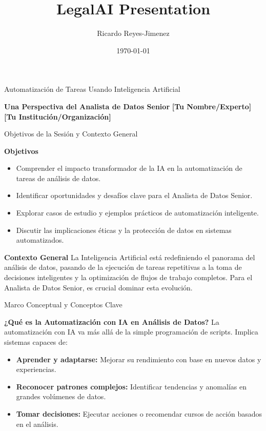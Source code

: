 \documentclass[aspectratio=169]{beamer}
\title[LegalAI Presentation]{LegalAI Presentation}
\subtitle{}
\author{Ricardo Reyes-Jimenez}
\institute{Universidad de La Sabana}
\date{\today}
\begin{document}
\begin{frame}
  \titlepage
\end{frame}

\usebackgroundtemplate{}


\begin{frame}{Automatización de Tareas Usando Inteligencia Artificial}

\textbf{Una Perspectiva del Analista de Datos Senior}
\textbf{[Tu Nombre/Experto]}
\textbf{[Tu Institución/Organización]}

\end{frame}

\begin{frame}{Objetivos de la Sesión y Contexto General}


\textbf{Objetivos}
\begin{itemize}
  \item Comprender el impacto transformador de la IA en la automatización de tareas de análisis de datos.
  \item Identificar oportunidades y desafíos clave para el Analista de Datos Senior.
  \item Explorar casos de estudio y ejemplos prácticos de automatización inteligente.
  \item Discutir las implicaciones éticas y la protección de datos en sistemas automatizados.
\end{itemize}
\textbf{Contexto General}
La Inteligencia Artificial está redefiniendo el panorama del análisis de datos, pasando de la ejecución de tareas repetitivas a la toma de decisiones inteligentes y la optimización de flujos de trabajo completos. Para el Analista de Datos Senior, es crucial dominar esta evolución.

\end{frame}

\begin{frame}{Marco Conceptual y Conceptos Clave}

\textbf{¿Qué es la Automatización con IA en Análisis de Datos?}
La automatización con IA va más allá de la simple programación de scripts. Implica sistemas capaces de:
\begin{itemize}
  \item \textbf{Aprender y adaptarse:} Mejorar su rendimiento con base en nuevos datos y experiencias.
  \item \textbf{Reconocer patrones complejos:} Identificar tendencias y anomalías en grandes volúmenes de datos.
  \item \textbf{Tomar decisiones:} Ejecutar acciones o recomendar cursos de acción basados en el análisis.
\end{itemize}
\end{frame}
\end{document}
